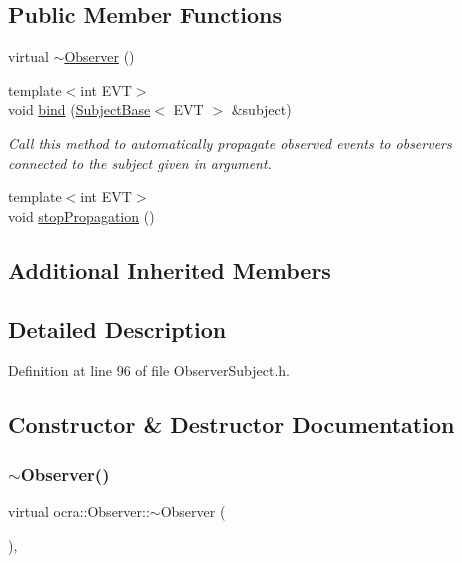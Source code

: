 \subsection*{Public Member Functions}
\begin{DoxyCompactItemize}
\item 
virtual \hyperlink{classocra_1_1Observer_ab151b904aff28f8829b0e40048f5e737}{$\sim$\+Observer} ()
\item 
{\footnotesize template$<$int E\+VT$>$ }\\void \hyperlink{classocra_1_1Observer_ab75bb7215b9e8af0e87420e29dd42c37}{bind} (\hyperlink{classocra_1_1SubjectBase}{Subject\+Base}$<$ E\+VT $>$ \&subject)
\begin{DoxyCompactList}\small\item\em Call this method to automatically propagate observed events to observers connected to the subject given in argument. \end{DoxyCompactList}\item 
{\footnotesize template$<$int E\+VT$>$ }\\void \hyperlink{classocra_1_1Observer_aa553cb069d393b84ec769f9f6367e1e3}{stop\+Propagation} ()
\end{DoxyCompactItemize}
\subsection*{Additional Inherited Members}


\subsection{Detailed Description}


Definition at line 96 of file Observer\+Subject.\+h.



\subsection{Constructor \& Destructor Documentation}
\hypertarget{classocra_1_1Observer_ab151b904aff28f8829b0e40048f5e737}{}\label{classocra_1_1Observer_ab151b904aff28f8829b0e40048f5e737} 
\subsubsection{\texorpdfstring{$\sim$\+Observer()}{~Observer()}}
{\footnotesize\ttfamily virtual ocra\+::\+Observer\+::$\sim$\+Observer (\begin{DoxyParamCaption}{ }\end{DoxyParamCaption})\hspace{0.3cm}{\ttfamily [inline]}, {\ttfamily [virtual]}}



